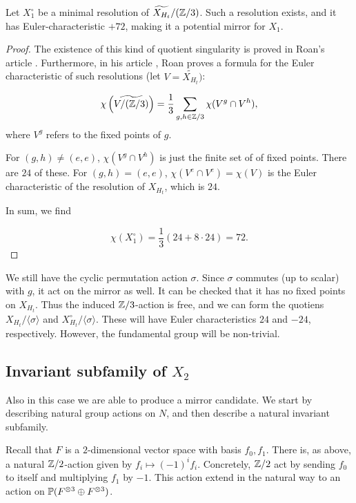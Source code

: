 \begin{theorem}
Let $X_1^\circ$ be a minimal resolution of $\widetilde{X_{H_t}}/(\Z/3)$. Such a resolution exists, and it has Euler-characteristic $+72$, making it a potential mirror for $X_1$.
\end{theorem}
\begin{proof}
The existence of this kind of quotient singularity is proved in Roan's article \cite{roan_minres}. Furthermore, in his article \cite{roan_euler}, Roan proves a formula for the Euler characteristic of such resolutions (let $V=\widetilde{X_{H_t}})$:

\[
\chi\left(\widetilde{V/(\Z/3)} \right) = \frac{1}{3} \sum_{g,h \in \Z/3}  \chi(V^g \cap V^h),
\]
where $V^g$ refers to the fixed points of $g$.

For $(g,h) \neq (e,e)$, $\chi(V^g \cap V^h)$ is just the finite set of of fixed points. There are $24$ of these. For $(g,h)=(e,e)$, $\chi(V^e \cap V^e)=\chi(V)$ is the Euler characteristic of the resolution of $X_{H_t}$, which is $24$.

In sum, we find

$$
\chi(X_1^\circ) = \frac 13 \left(24 + 8 \cdot 24\right)=72.
$$
\end{proof}

\begin{remark}
We still have the cyclic permutation action $\sigma$. Since $\sigma$ commutes (up to scalar) with $g$, it act on the mirror as well. It can be checked that it has no fixed points on $X_{H_t}$. Thus the induced $\Z/3$-action is free, and we can form the quotiens $X_{H_t}/\langle \sigma \rangle $ and $X_{H_t}^\circ/\langle \sigma \rangle$. These will have Euler characteristics $24$ and $-24$, respectively. However, the fundamental group will be non-trivial.
\end{remark}


\subsection{Invariant subfamily of $X_2$}

Also in this case we are able to produce a mirror candidate. We start by describing natural group actions on $N$, and then describe a natural invariant subfamily. 

Recall that $F$ is a $2$-dimensional vector space with basis $f_0, f_1$. There is, as above, a natural $\Z/2$-action given by $f_i \mapsto (-1)^i f_i$. Concretely, $\Z/2$ act by sending $f_0$ to itself and multiplying $f_1$ by $-1$. This action extend in the natural way to an action on $\P(F^{\otimes 3} \oplus F^{\otimes 3})$.

